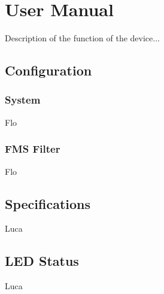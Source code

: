 \chapter{User Manual}

Description of the function of the device...

\section{Configuration}
\subsection{System}
Flo
\subsection{FMS Filter}
Flo

\section{Specifications}
Luca

\section{LED Status}
Luca

